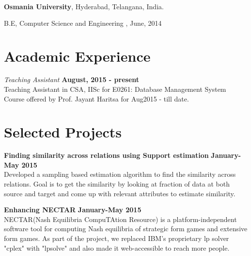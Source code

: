 \documentclass[margin,line]{res}
\newenvironment{list1}{
  \begin{list}{\ding{113}}{%
      \setlength{\itemsep}{0in}
      \setlength{\parsep}{0in} \setlength{\parskip}{0in}
      \setlength{\topsep}{0in} \setlength{\partopsep}{0in} 
      \setlength{\leftmargin}{0.17in}}}{\end{list}}
\begin{document}
\begin{resume}
{\bf Osmania University}, Hyderabad, Telangana, India.\\
\vspace*{-.1in}
\begin{list1}
\item[] B.E, Computer Science and Engineering ,  June, 2014
\end{list1}


%

\section{\sc Academic Experience}
{\em Teaching Assistant} \hfill {\bf August, 2015  - present}\\
Teaching Assistant in CSA, IISc for E0261: Database Management System Course offered by Prof. Jayant Haritsa for Aug2015 - till date.

\section{\sc Selected Projects}
{\bf Finding similarity across relations using Support estimation}
\hfill {\bf January-May 2015}\\
Developed a sampling based estimation algorithm to find the similarity across relations. Goal is to get the similarity by looking at fraction of data at both source and target and come up with relevant attributes to estimate similarity. 

{\bf Enhancing NECTAR}
\hfill {\bf  January-May 2015}\\
NECTAR(Nash Equilibria CompuTAtion Resource) is a platform-independent software tool for computing Nash equilibria of strategic form games and extensive form games. As part of the project, we replaced IBM's proprietary lp solver "cplex" with "lpsolve" and also made it web-accessible to reach more people. 


\end{resume}
\end{document}
